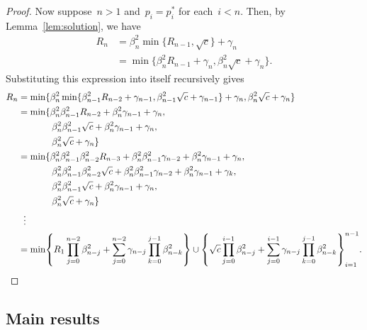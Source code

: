 \documentclass[11pt,oneside]{article}
\begin{document}
\begin{proof}
    Now suppose~$n>1$ and~$p_i=p_i^*$ for each~$i<n$.
    Then, by Lemma~\ref{lem:solution}, we have
    \begin{align*}
        R_n
        &= \beta_n^2\min\{R_{n-1},\sqrt{c}\}+\gamma_n \\
        &= \min\{\beta_n^2R_{n-1}+\gamma_n,\beta_n^2\sqrt{c}+\gamma_n\}.
    \end{align*}
    Substituting this expression into itself recursively gives
    \begin{align*}
        R_n
        &= \min\{\beta_n^2\min\{\beta_{n-1}^2R_{n-2}+\gamma_{n-1},\beta_{n-1}^2\sqrt{c}+\gamma_{n-1}\}+\gamma_n,\beta_n^2\sqrt{c}+\gamma_n\} \\
        &= \min\{\beta_n^2\beta_{n-1}^2R_{n-2}+\beta_n^2\gamma_{n-1}+\gamma_n, \\
        &\hspace{3.7em} \beta_n^2\beta_{n-1}^2\sqrt{c}+\beta_n^2\gamma_{n-1}+\gamma_n, \\
        &\hspace{3.7em} \beta_n^2\sqrt{c}+\gamma_n\} \\
        &= \min\{\beta_n^2\beta_{n-1}^2\beta_{n-2}^2R_{n-3}+\beta_n^2\beta_{n-1}^2\gamma_{n-2}+\beta_n^2\gamma_{n-1}+\gamma_n, \\
        &\hspace{3.7em} \beta_n^2\beta_{n-1}^2\beta_{n-2}^2\sqrt{c}+\beta_n^2\beta_{n-1}^2\gamma_{n-2}+\beta_n^2\gamma_{n-1}+\gamma_k, \\
        &\hspace{3.7em} \beta_n^2\beta_{n-1}^2\sqrt{c}+\beta_n^2\gamma_{n-1}+\gamma_n, \\
        &\hspace{3.7em} \beta_n^2\sqrt{c}+\gamma_n\} \\
        &\hspace{0.6em} \vdots \\
        &= \min\left\{R_1\prod_{j=0}^{n-2}\beta_{n-j}^2+\sum_{j=0}^{n-2}\gamma_{n-j}\prod_{k=0}^{j-1}\beta_{n-k}^2\right\}\cup\left\{\sqrt{c}\prod_{j=0}^{i-1}\beta_{n-j}^2+\sum_{j=0}^{i-1}\gamma_{n-j}\prod_{k=0}^{j-1}\beta_{n-k}^2\right\}_{i=1}^{n-1}.\qedhere
    \end{align*}
\end{proof}

\subsection{Main results}






\end{document}
